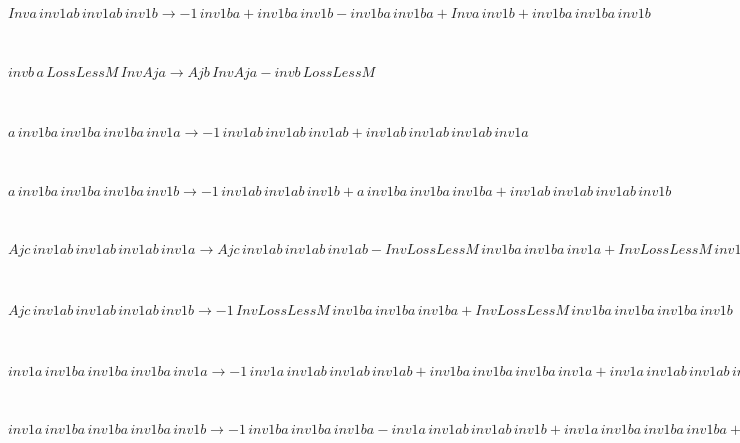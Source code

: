 \begin{minipage}{6in}
$
Inva\,
 inv1ab\,
 inv1ab\,
 inv1b\rightarrow -1\,
 inv1ba + inv1ba\,
 inv1b - inv1ba\,
 inv1ba + Inva\,
 inv1b + inv1ba\,
 inv1ba\,
 inv1b
$
\end{minipage}\medskip \\
\begin{minipage}{6in}
$
invb\,
 a\,
 LossLessM\,
 InvAja\rightarrow Ajb\,
 InvAja - invb\,
 LossLessM
$
\end{minipage}\medskip \\
\begin{minipage}{6in}
$
a\,
 inv1ba\,
 inv1ba\,
 inv1ba\,
 inv1a\rightarrow -1\,
 inv1ab\,
 inv1ab\,
 inv1ab + inv1ab\,
 inv1ab\,
 inv1ab\,
 inv1a
$
\end{minipage}\medskip \\
\begin{minipage}{6in}
$
a\,
 inv1ba\,
 inv1ba\,
 inv1ba\,
 inv1b\rightarrow -1\,
 inv1ab\,
 inv1ab\,
 inv1b + a\,
 inv1ba\,
 inv1ba\,
 inv1ba + inv1ab\,
 inv1ab\,
 inv1ab\,
 inv1b
$
\end{minipage}\medskip \\
\begin{minipage}{6in}
$
Ajc\,
 inv1ab\,
 inv1ab\,
 inv1ab\,
 inv1a\rightarrow Ajc\,
 inv1ab\,
 inv1ab\,
 inv1ab - InvLossLessM\,
 inv1ba\,
 inv1ba\,
 inv1a + InvLossLessM\,
 inv1ba\,
 inv1ba\,
 inv1ba\,
 inv1a
$
\end{minipage}\medskip \\
\begin{minipage}{6in}
$
Ajc\,
 inv1ab\,
 inv1ab\,
 inv1ab\,
 inv1b\rightarrow -1\,
 InvLossLessM\,
 inv1ba\,
 inv1ba\,
 inv1ba + InvLossLessM\,
 inv1ba\,
 inv1ba\,
 inv1ba\,
 inv1b
$
\end{minipage}\medskip \\
\begin{minipage}{6in}
$
inv1a\,
 inv1ba\,
 inv1ba\,
 inv1ba\,
 inv1a\rightarrow -1\,
 inv1a\,
 inv1ab\,
 inv1ab\,
 inv1ab + inv1ba\,
 inv1ba\,
 inv1ba\,
 inv1a + inv1a\,
 inv1ab\,
 inv1ab\,
 inv1ab\,
 inv1a
$
\end{minipage}\medskip \\
\begin{minipage}{6in}
$
inv1a\,
 inv1ba\,
 inv1ba\,
 inv1ba\,
 inv1b\rightarrow -1\,
 inv1ba\,
 inv1ba\,
 inv1ba - inv1a\,
 inv1ab\,
 inv1ab\,
 inv1b + inv1a\,
 inv1ba\,
 inv1ba\,
 inv1ba + inv1ba\,
 inv1ba\,
 inv1ba\,
 inv1b + inv1a\,
 inv1ab\,
 inv1ab\,
 inv1ab\,
 inv1b
$
\end{minipage}\medskip \\

